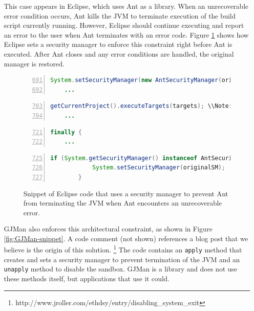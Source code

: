 \documentclass{sig-alternate}
\begin{document}
This case appears in Eclipse, which uses Ant as a library. When an
unrecoverable error condition occurs, Ant kills the JVM to terminate
execution of the build script currently running. However, Eclipse
should continue executing and report an error to the user when Ant
terminates with an error code. Figure \ref{fig:Eclipse-snippet} shows
how Eclipse sets a security manager to enforce this constraint right
before Ant is executed. After Ant closes and any error conditions
are handled, the original manager is restored.

\begin{figure}
\begin{lstlisting}[language=Java,numbers=left,basicstyle={\scriptsize},breaklines=true,firstnumber=691,xrightmargin={0.1cm},numbersep={-10pt}]
    System.setSecurityManager(new AntSecurityManager(originalSM, Thread.currentThread()));
    ...
\end{lstlisting}


\begin{lstlisting}[language=Java,numbers=left,basicstyle={\scriptsize},breaklines=true,firstnumber=703,xrightmargin={0.1cm},numbersep={-10pt}]
    getCurrentProject().executeTargets(targets); \\Note: Ant is executed on this line
    ...
\end{lstlisting}


\begin{lstlisting}[language=Java,numbers=left,basicstyle={\scriptsize},breaklines=true,firstnumber=721,xrightmargin={0.1cm},numbersep={-10pt}]
    finally {
    ...
\end{lstlisting}


\begin{lstlisting}[language=Java,numbers=left,basicstyle={\scriptsize},breaklines=true,firstnumber=725,xrightmargin={0.1cm},numbersep={-10pt}]
        if (System.getSecurityManager() instanceof AntSecurityManager) { 
            System.setSecurityManager(originalSM); 
        }
\end{lstlisting}


\protect\caption{Snippet of Eclipse code that uses a security manager to prevent Ant
from terminating the JVM when Ant encounters an unrecoverable error.}\label{fig:Eclipse-snippet}
\end{figure}


GJMan also enforces this architectural constraint, as shown in Figure
\ref{fig:GJMan-snippet}. A code comment (not shown) references a
blog post that we believe is the origin of this solution.%
\footnote{http://www.jroller.com/ethdsy/entry/disabling\_system\_exit%
} The code contains an \texttt{apply} method that creates and sets
a security manager to prevent termination of the JVM and an \texttt{unapply}
method to disable the sandbox. GJMan is a library and does not use
these methods itself, but applications that use it could. 
\end{document}

